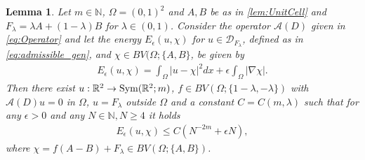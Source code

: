 \documentclass[a4paper, 10pt, twoside, notitlepage]{amsart}
\theoremstyle{plain}
\newtheorem{lem}[prop]{Lemma}
\newcommand{\R}{\mathbb{R}}
\newcommand{\N}{\mathbb{N}}
\newcommand{\A}{\mathcal{A}}
\begin{document}
		\begin{lem} \label{lem:Branching} Let $m \in \N$, $\Omega = (0,1)^2$ and $A,B$ be as in \cref{lem:UnitCell} and $F_\lambda= \lambda A + (1-\lambda) B$ for $\lambda \in (0,1)$.  Consider the
                  operator $\A(D)$ given in \eqref{eq:Operator} and let the energy $E_{\epsilon}(u,\chi)$ for $u \in \mathcal{D}_{F_\lambda}$, defined as in \eqref{eq:admissible_gen}, and $\chi \in BV(\Omega;\{A,B\}$, be given by
                  \begin{align*}
                    E_\epsilon(u,\chi) = \int_\Omega |u-\chi|^2 dx + \epsilon \int_\Omega |\nabla \chi|.
                  \end{align*}
                  Then there exist $u: \R^2 \to \textup{Sym}(\R^2;m)$,
			$f \in BV(\Omega;\{1-\lambda,-\lambda\})$ with $\A(D)u = 0$ in $\Omega$, $u = F_\lambda$ outside $\Omega$ and a constant $C = C(m,\lambda)$ such that for any $\epsilon >0$ and any
			$N \in \N, N \geq 4$ it holds
			\begin{align*}
				E_{\epsilon}(u,\chi) \leq C(N^{-2m} + \epsilon N),
			\end{align*}
			where $\chi = f (A-B) + F_\lambda \in BV(\Omega;\{A,B\})$.
		\end{lem}
		
\end{document}
